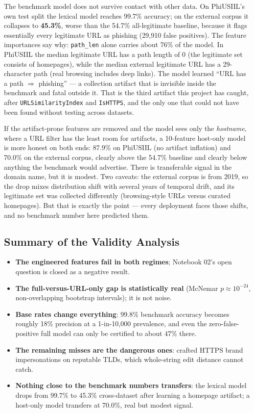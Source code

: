 \documentclass[stu,12pt,floatsintext]{apa7}
\newcommand{\code}[1]{\texttt{#1}}
\begin{document}
The benchmark model does not survive contact with other data. On
PhiUSIIL's own test split the lexical model reaches 99.7\% accuracy; on
the external corpus it collapses to \textbf{45.3\%}, worse than the
54.7\% all-legitimate baseline, because it flags essentially every
legitimate URL as phishing (29{,}910 false positives). The feature
importances say why: \code{path\_len} alone carries about 76\% of the
model. In PhiUSIIL the median legitimate URL has a path length of 0 (the
legitimate set consists of homepages), while the median external
legitimate URL has a 29-character path (real browsing includes deep
links). The model learned ``URL has a path $\Rightarrow$ phishing'' --- a
collection artifact that is invisible inside the benchmark and fatal
outside it. That is the third artifact this project has caught, after
\code{URLSimilarityIndex} and \code{IsHTTPS}, and the only one that could
not have been found without testing across datasets.

If the artifact-prone features are removed and the model sees only the
\emph{hostname}, where a URL filter has the least room for artifacts, a
10-feature host-only model is more honest on both ends: 87.9\% on
PhiUSIIL (no artifact inflation) and 70.0\% on the external corpus,
clearly above the 54.7\% baseline and clearly below anything the
benchmark would advertise. There is transferable signal in the domain
name, but it is modest. Two caveats: the external corpus is from 2019, so
the drop mixes distribution shift with several years of temporal drift,
and its legitimate set was collected differently (browsing-style URLs
versus curated homepages). But that is exactly the point --- every
deployment faces those shifts, and no benchmark number here predicted
them.

\subsection{Summary of the Validity Analysis}

\begin{itemize}
  \item \textbf{The engineered features fail in both regimes}; Notebook
    02's open question is closed as a negative result.
  \item \textbf{The full-versus-URL-only gap is statistically real}
    (McNemar $p \approx 10^{-24}$, non-overlapping bootstrap intervals);
    it is not noise.
  \item \textbf{Base rates change everything}: 99.8\% benchmark accuracy
    becomes roughly 18\% precision at a 1-in-10{,}000 prevalence, and
    even the zero-false-positive full model can only be certified to
    about 47\% there.
  \item \textbf{The remaining misses are the dangerous ones}: crafted
    HTTPS brand impersonations on reputable TLDs, which whole-string
    edit distance cannot catch.
  \item \textbf{Nothing close to the benchmark numbers transfers}: the
    lexical model drops from 99.7\% to 45.3\% cross-dataset after
    learning a homepage artifact; a host-only model transfers at 70.0\%,
    real but modest signal.
\end{itemize}
\end{document}
